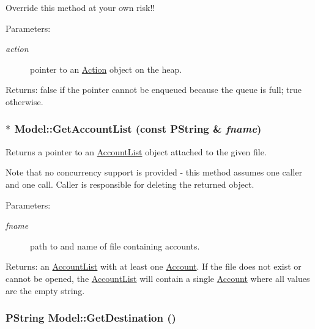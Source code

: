 Override this method at your own risk!!  \begin{Desc}
\item[Parameters:]
\begin{description}
\item[{\em action}]pointer to an \hyperlink{classAction}{Action} object on the heap. \end{description}
\end{Desc}
\begin{Desc}
\item[Returns:]false if the pointer cannot be enqueued because the queue is full; true otherwise. \end{Desc}
\hypertarget{classModel_a0be0a124810faa919249d9a51bde1f4}{
\subsubsection[{GetAccountList}]{ $\ast$ Model::GetAccountList (const PString \& {\em fname})}}
\label{classModel_a0be0a124810faa919249d9a51bde1f4}


Returns a pointer to an \hyperlink{classAccountList}{AccountList} object attached to the given file. 

Note that no concurrency support is provided - this method assumes one caller and one call. Caller is responsible for deleting the returned object. \begin{Desc}
\item[Parameters:]
\begin{description}
\item[{\em fname}]path to and name of file containing accounts. \end{description}
\end{Desc}
\begin{Desc}
\item[Returns:]an \hyperlink{classAccountList}{AccountList} with at least one \hyperlink{classAccount}{Account}. If the file does not exist or cannot be opened, the \hyperlink{classAccountList}{AccountList} will contain a single \hyperlink{classAccount}{Account} where all values are the empty string. \end{Desc}
\hypertarget{classModel_b4354c982ea5543a43f9dfc0874ece20}{
\subsubsection[{GetDestination}]{\setlength{\rightskip}{0pt plus 5cm}PString Model::GetDestination ()}}
\label{classModel_b4354c982ea5543a43f9dfc0874ece20}


